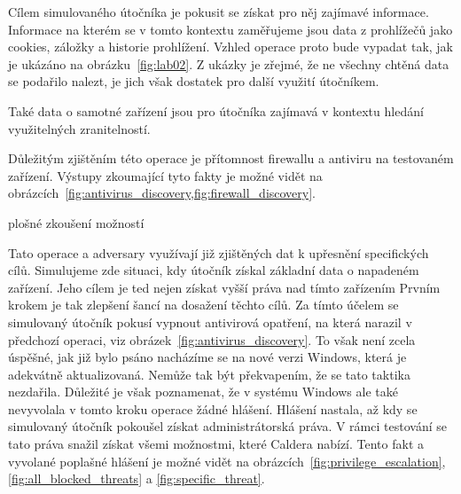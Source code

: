 Cílem simulovaného útočníka je pokusit se získat pro něj zajímavé informace.
Informace na kterém se v tomto kontextu zaměřujeme jsou data z prohlížečů jako cookies, záložky a historie prohlížení.
Vzhled operace proto bude vypadat tak, jak je ukázáno na obrázku~\ref{fig:lab02}.
Z ukázky je zřejmé, že ne všechny chtěná data se podařilo nalezt, je jich však dostatek pro další využití útočníkem.



Také data o samotné zařízení jsou pro útočníka zajímavá v kontextu hledání využitelných zranitelností.


Důležitým zjištěním této operace je přítomnost firewallu a antiviru na testovaném zařízení.
Výstupy zkoumající tyto fakty je možné vidět na obrázcích~\ref{fig:antivirus_discovery,fig:firewall_discovery}.



plošné zkoušení možností

Tato operace a adversary využívají již zjištěných dat k upřesnění specifických cílů.
Simulujeme zde situaci, kdy útočník získal základní data o napadeném zařízení.
Jeho cílem je ted nejen získat vyšší práva nad tímto zařízením
Prvním krokem je tak zlepšení šancí na dosažení těchto cílů.
Za tímto účelem se simulovaný útočník pokusí vypnout antivirová opatření, na která narazil v předchozí operaci, viz obrázek~\ref{fig:antivirus_discovery}.
To však není zcela úspěšné, jak již bylo psáno nacházíme se na nové verzi Windows, která je adekvátně aktualizovaná.
Nemůže tak být překvapením, že se tato taktika nezdařila.
Důležité je však poznamenat, že v systému Windows ale také nevyvolala v tomto kroku operace žádné hlášení.
Hlášení nastala, až kdy se simulovaný útočník pokoušel získat administrátorská práva.
V rámci testování se tato práva snažil získat všemi možnostmi, které Caldera nabízí.
Tento fakt a vyvolané poplašné hlášení je možné vidět na obrázcích~\ref{fig:privilege_escalation},\ref{fig:all_blocked_threats} a \ref{fig:specific_threat}.


